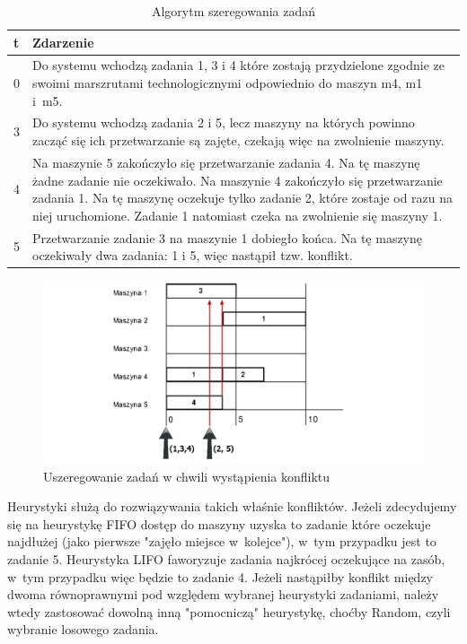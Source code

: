 \documentclass[twoside]{kInzynierka}
\begin{document}
\begin{table}[htb]
    \centering
    \caption{Algorytm szeregowania zadań}
    \begin{tabular}{ p{0.75cm} | p{13cm} }
    t & Zdarzenie \\ \hline
    0 & Do systemu wchodzą zadania 1, 3 i 4 które zostają przydzielone zgodnie ze swoimi marszrutami technologicznymi odpowiednio do maszyn m4, m1 i~m5.  \\ \hline
    3 & Do systemu wchodzą zadania 2 i 5, lecz maszyny na których powinno zacząć się ich przetwarzanie są zajęte, czekają więc na zwolnienie maszyny. \\ \hline
    4 & Na maszynie 5 zakończyło się przetwarzanie zadania 4. Na tę maszynę żadne zadanie nie oczekiwało. Na maszynie 4 zakończyło się przetwarzanie zadania 1. Na tę maszynę oczekuje tylko zadanie 2, które zostaje od razu na niej uruchomione. Zadanie 1 natomiast czeka na zwolnienie się maszyny 1. \\ \hline
    5 & Przetwarzanie zadanie 3 na maszynie 1 dobiegło końca. Na tę maszynę oczekiwały dwa zadania: 1 i 5, więc nastąpił tzw. konflikt.
    \end{tabular}
\end{table}

\begin{figure}[htb]
    \centering
    \includegraphics[width=\textwidth, keepaspectratio=true]{./obrazki/konf}
    \caption{Uszeregowanie zadań w chwili wystąpienia konfliktu}
\end{figure}

Heurystyki służą do rozwiązywania takich właśnie konfliktów. Jeżeli zdecydujemy się na heurystykę FIFO dostęp do maszyny uzyska to zadanie które oczekuje najdłużej (jako pierwsze "zajęło miejsce w~kolejce"), w~tym przypadku jest to zadanie 5. Heurystyka LIFO faworyzuje zadania najkrócej oczekujące na zasób, w~tym przypadku więc będzie to zadanie 4. Jeżeli nastąpiłby konflikt między dwoma równoprawnymi pod względem wybranej heurystyki zadaniami, należy wtedy zastosować dowolną inną "pomocniczą" heurystykę, choćby Random, czyli wybranie losowego zadania.
\end{document}
